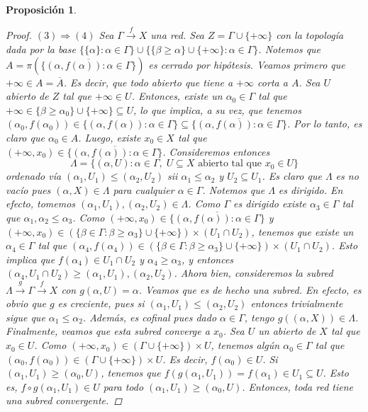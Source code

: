 \documentclass[12pt]{book}
\newtheorem{prop}[teo]{Proposición}
\theoremstyle{definition}
\begin{document}
\begin{prop}
\begin{proof}
$(3)\Longrightarrow(4)$ Sea $\Gamma\stackrel{f}{\longrightarrow} X$ una red. Sea $Z=\Gamma\cup\{+\infty\}$ con la topología dada por la base $\{\{\alpha\} : \alpha\in\Gamma\} \cup \{\{\beta\geq\alpha\} \cup \{+\infty\} : \alpha\in\Gamma\}$. Notemos que $A=\pi(\overline{\{(\alpha,f(\alpha)) : \alpha\in \Gamma\}})$ es cerrado por hipótesis. Veamos primero que $+\infty\in A = \overline{A}$. Es decir, que todo abierto que tiene a $+\infty$ corta a $A$. Sea $U$ abierto de $Z$ tal que $+\infty\in U$. Entonces, existe un $\alpha_0\in\Gamma$ tal que $+\infty\in \{\beta\geq \alpha_0\}\cup\{+\infty\}\subseteq U$, lo que implica, a su vez, que tenemos $(\alpha_0,f(\alpha_0))\in \{(\alpha,f(\alpha)) : \alpha\in\Gamma\}\subseteq \overline{\{(\alpha,f(\alpha)) : \alpha\in\Gamma\}}$. Por lo tanto, es claro que $\alpha_0\in A$. Luego, existe $x_0\in X$ tal que $(+\infty,x_0)\in\overline{\{(\alpha,f(\alpha)) : \alpha\in\Gamma\}}$. Consideremos entonces $$\Lambda = \{(\alpha,U) : \alpha\in\Gamma, \; U\subseteq X \text{ abierto tal que }x_0\in U\}$$ ordenado vía $(\alpha_1,U_1)\leq (\alpha_2,U_2)$ sii $\alpha_1\leq \alpha_2$ y $U_2\subseteq U_1$. Es claro que $\Lambda$ es no vacío pues $(\alpha,X)\in\Lambda$ para cualquier $\alpha\in\Gamma$. Notemos que $\Lambda$ es dirigido. En efecto, tomemos $(\alpha_1,U_1),(\alpha_2,U_2)\in\Lambda$. Como $\Gamma$ es dirigido existe $\alpha_3\in\Gamma$ tal que $\alpha_1,\alpha_2\leq\alpha_3$. Como $(+\infty,x_0)\in\overline{\{(\alpha,f(\alpha)):\alpha\in\Gamma\}}$ y $(+\infty,x_0)\in (\{\beta\in\Gamma : \beta\geq\alpha_3\}\cup\{+\infty\})\times (U_1\cap U_2)$, tenemos que existe un $\alpha_4\in\Gamma$ tal que $(\alpha_4,f(\alpha_4))\in (\{\beta\in\Gamma : \beta\geq \alpha_3\} \cup\{+\infty\})\times (U_1\cap U_2)$. Esto implica que $f(\alpha_4)\in U_1\cap U_2$ y $\alpha_4\geq \alpha_3$, y entonces $(\alpha_4,U_1\cap U_2)\geq (\alpha_1,U_1),(\alpha_2,U_2)$. Ahora bien, consideremos la subred $\Lambda\stackrel{g}{\longrightarrow} \Gamma \stackrel{f}{\longrightarrow} X$ con $g(\alpha,U)=\alpha$. Veamos que es de hecho una subred. En efecto, es obvio que $g$ es creciente, pues si $(\alpha_1,U_1)\leq (\alpha_2, U_2)$ entonces trivialmente sigue que $\alpha_1\leq \alpha_2$. Además, es cofinal pues dado $\alpha\in\Gamma$, tengo $g((\alpha,X))\in\Lambda$. Finalmente, veamos que esta subred converge a $x_0$. Sea $U$ un abierto de $X$ tal que $x_0\in U$. Como $(+\infty,x_0)\in (\Gamma\cup \{+\infty\})\times U$, tenemos algún $\alpha_0\in\Gamma$ tal que $(\alpha_0,f(\alpha_0))\in (\Gamma\cup \{+\infty\})\times U$. Es decir, $f(\alpha_0)\in U$. Si $(\alpha_1,U_1)\geq (\alpha_0,U)$, tenemos que $f(g(\alpha_1,U_1)) = f(\alpha_1)\in U_1\subseteq U$. Esto es, $f\circ g(\alpha_1,U_1)\in U$ para todo $(\alpha_1,U_1)\geq (\alpha_0,U)$. Entonces, toda red tiene una subred convergente.


\end{proof}
\end{prop}
\end{document}
